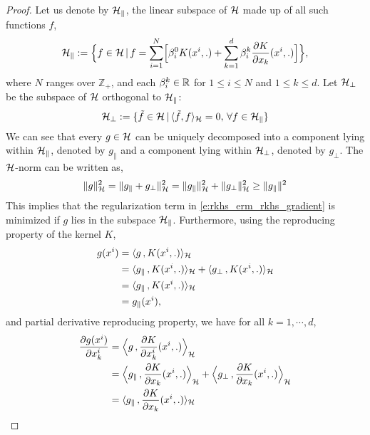 \begin{proof}
Let us denote by ${\cal H}_\parallel$, the linear subspace of ${\cal H}$ made up of all such functions $f$,
	\[
	{\cal H}_\parallel := \Bigl\{f \in {\cal H}\, |\, f = \sum_{i=1}^N \Bigl[ \beta^0_i K(x^i,.) + \sum_{k=1}^d \beta_i^k \frac{\partial K }{\partial x_k} (x^i, .)\Bigr]\Bigr\},
	\]
	where $N$ ranges over $\mathbb{Z}_+$, and  each $\beta_i^k \in \mathbb{R}$ for $1 \leq i \leq N$ and $1 \leq k \leq d$. Let ${\cal H}_{\perp}$ be the subspace of ${\cal H}$ orthogonal to ${\cal H}_\parallel$:
	\[
	{\cal H}_\perp : = \{ \tilde f \in {\cal H}\,| \, \langle \tilde f , f \rangle_{\cal H} = 0 ,\, \forall f \in {\cal H}_\parallel \}
	\]
	We can see that every $g \in {\cal H}$ can be uniquely decomposed into a component lying within ${\cal H}_\parallel$, denoted by $g_\parallel$ and a component lying within ${\cal H}_\perp$, denoted by $g_\perp$.
	The ${\cal H}$-norm can be written as,
	\begin{equation}
	\|g\|^2_\clH = \|g_\parallel + g_\perp\|^2_\clH = \|g_\parallel\|^2_\clH + \|g_\perp\|^2_\clH \geq \|g_\parallel\|^2
	\label{e:rkhs_g_reg}
	\end{equation}
	This implies that the regularization term in \eqref{e:rkhs_erm_rkhs_gradient} is minimized if $g$ lies in the subspace ${\cal H}_\parallel$. Furthermore, using the reproducing property of the kernel $K$,
	\begin{equation}
	\begin{aligned}
	g(x^i) & =  \langle g \, , K(x^i,.) \rangle_\clH\\
	&  = \langle g_\parallel\, , K(x^i,.) \rangle_\clH + \langle g_\perp \, , K(x^i,.) \rangle_\clH \\
	&  = \langle g_\parallel\, , K(x^i,.) \rangle_\clH \\
	&  = g_\parallel(x^i),
	\end{aligned}
	\label{e:rkhs_g_parallel}
	\end{equation}
	and partial derivative reproducing property, we have for all $k = 1, \cdots, d$,
	\begin{equation}
	\begin{aligned}
	\frac{\partial g(x^i)}{\partial x^i_k} & = \Bigl \langle g \, , \frac{\partial K}{\partial x^i_k} (x^i,.) \Bigr \rangle_\clH\\
	&  = \Bigl \langle g_\parallel\, , \frac{\partial K}{\partial x_k} (x^i,.)  \Bigr \rangle_\clH + \Bigl \langle g_\perp \, ,\frac{\partial K}{\partial x_k} (x^i,.) \Bigr \rangle_\clH \\
	&  = \langle g_\parallel\, , \frac{\partial K}{\partial x_k} (x^i,.) \rangle_\clH \\

\end{aligned}
\end{equation}
\end{proof}
